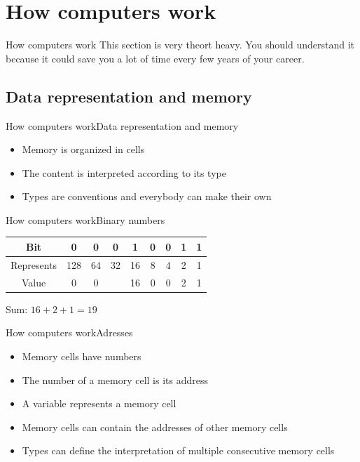 \documentclass[aspectratio=169]{beamer}
\begin{document}
\section{How computers work}
\begin{frame}{How computers work}
	This section is very theort heavy.
	You should understand it because it could save you a lot of time every few years of your career.
\end{frame}

\subsection{Data representation and memory}
\begin{frame}{How computers work}{Data representation and memory}
\begin{itemize}
	\item Memory is organized in cells
	\item The content is interpreted according to its type
	\item Types are conventions and everybody can make their own
\end{itemize}
\end{frame}

\begin{frame}{How computers work}{Binary numbers}

\begin{tabular}{c|cccccccc}
	Bit        & 0   & 0  & 0  & 1  & 0 & 0 & 1 & 1 
	\pause
	\\ \hline
	Represents & 128 & 64 & 32 & 16 & 8 & 4 & 2 & 1 \\ 
	Value      & 0   & 0  &    & 16 & 0 & 0 & 2 & 1 \\
\end{tabular}
\pause
\vspace{2em}

Sum:
\begin{math}
	16 + 2 + 1 = 19
\end{math}
\end{frame}

\begin{frame}{How computers work}{Adresses}
\begin{itemize}
	\item Memory cells have numbers
	\item The number of a memory cell is its address
	\item A variable represents a memory cell
	\pause
	\item Memory cells can contain the addresses of other memory cells
	\item Types can define the interpretation of multiple consecutive memory cells
\end{itemize}
\end{frame}
\end{document}
